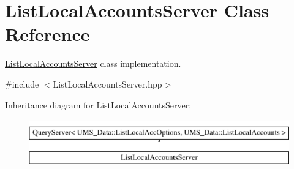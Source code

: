 \hypertarget{classListLocalAccountsServer}{
\section{ListLocalAccountsServer Class Reference}
\label{classListLocalAccountsServer}
}


\hyperlink{classListLocalAccountsServer}{ListLocalAccountsServer} class implementation.  




{\ttfamily \#include $<$ListLocalAccountsServer.hpp$>$}

Inheritance diagram for ListLocalAccountsServer:\begin{figure}[H]
\begin{center}
\leavevmode
\includegraphics[height=2.000000cm]{classListLocalAccountsServer}
\end{center}
\end{figure}
